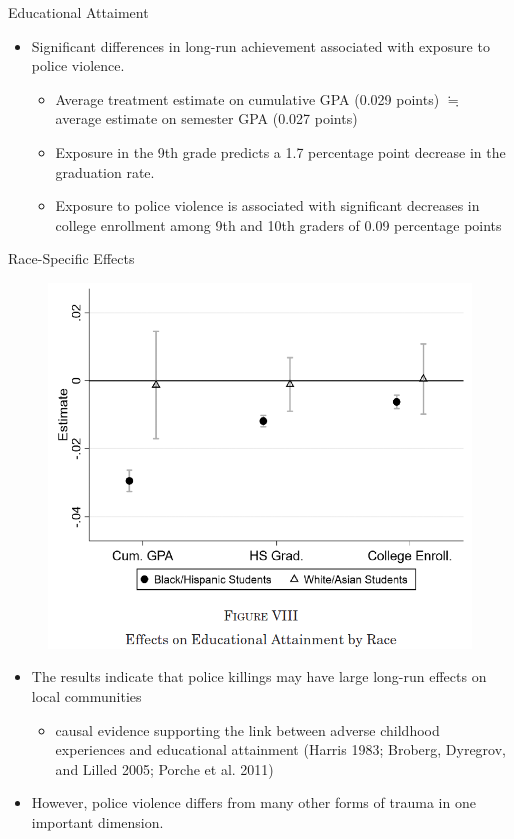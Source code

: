 \documentclass[dvipdfmx]{beamer}
\begin{document}
\begin{frame}{Educational Attaiment}
  \begin{itemize}
    \item Significant differences in long-run achievement associated with exposure to police violence.
    \begin{itemize}
      \item Average treatment estimate on cumulative GPA (0.029 points) $\fallingdotseq$ average estimate on semester GPA (0.027 points)
      \item Exposure in the 9th grade predicts a 1.7 percentage point decrease in the graduation rate.
      \item Exposure to police violence is associated with significant decreases in college enrollment among 9th and 10th graders of 0.09 percentage points
    \end{itemize}
  \end{itemize}
\end{frame}

\begin{frame}{Race-Specific Effects}
  \begin{figure}
    \centering
    \includegraphics[scale = .55]{fig_tab/os20220113/F8}
  \end{figure}
\end{frame}

\begin{frame}{}
  \begin{itemize}
    \item The results indicate that police killings may have large long-run effects on local communities
    \begin{itemize}
      \item causal evidence supporting the link between adverse childhood experiences and educational attainment (Harris 1983; Broberg, Dyregrov, and Lilled 2005; Porche et al.
      2011)
    \end{itemize}
    \item However, police violence differs from many other forms of trauma in one important dimension.
  \end{itemize}
\end{frame}
\end{document}

